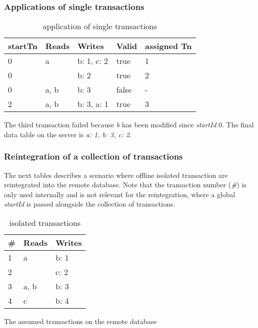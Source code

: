 \subsubsection{Applications of single transactions}

\begin{table}[h]
\centering
\begin{tabular}{|lllll|}
  \hline
  startTn & Reads & Writes & Valid & assigned Tn\\ \hline
  0       & a     & b: 1, c: 2  & true  & 1 \\
  0       &       & b: 2        & true  & 2 \\
  0       & a, b  & b: 3        & false & - \\
  2       & a, b  & b: 3, a: 1  & true  & 3 \\
  \hline
\end{tabular}
\caption{application of single transactions}
\label{tab:application-of-single-transactions}
\end{table}

The third transaction failed because \emph{b} has been modified since
\emph{startId} 0. The final data table on the server is \emph{a: 1, b: 3, c: 2}.

\subsubsection{Reintegration of a collection of transactions}

The next tables describes a scenario where offline isolated transaction are
reintegrated into the remote database. Note that the transaction number
(\emph{\#}) is only used internally and is not relevant for the reintegration,
where a global \emph{startId} is passed alongside the collection of
transactions.

\begin{table}[h]
\centering
\begin{tabular}{|lll|}
  \hline
  \# & Reads & Writes \\ \hline
  1 & a     & b: 1 \\
  2 &       & c: 2 \\
  3 & a, b  & b: 3 \\
  4 & c     & b: 4 \\
  \hline
\end{tabular}
\caption{isolated transactions}
\label{tab:isolated-transactions}
\end{table}

The assumed transactions on the remote database


